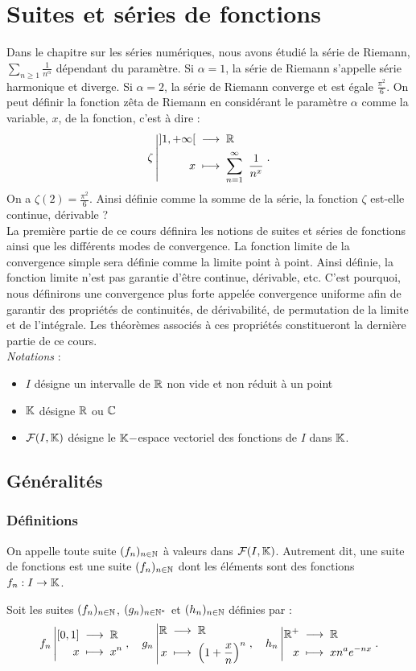 \documentclass{book}
\newcommand{\FIK}{\mathcal{F}(I,\K  )}
\newcommand{\fn}{(f_n)_{n\in \N   }}
\begin{document}
\chapter{Suites et séries de fonctions}

Dans le chapitre sur les séries numériques, nous avons étudié la série de Riemann, $\sum _{n\geq 1}{\frac {1}{n^{\alpha }}}$ dépendant du paramètre. Si $\alpha=1$, la série de Riemann s'appelle série harmonique et diverge. Si $\alpha=2$, la série de Riemann converge et est égale $\frac{\pi^2}{6}$.  On peut définir la fonction zêta de Riemann en considérant le paramètre $\alpha$ comme la variable, $x$, de la fonction, c'est à dire :
$$ {\zeta}\left|\begin{aligned}{]1,+\infty[}&\;\longrightarrow\;{\mathbb{R} }\\{x}&\;\longmapsto\;{\sum _{n=1}^{\infty }\ {\frac {1}{n^{x}}}}\end{aligned}\right..$$On a $\zeta(2)= \frac{\pi^2}{6}$. Ainsi définie comme la somme de la série, la fonction $\zeta$ est-elle continue, dérivable ? \\
La première partie de ce cours définira les notions de suites et séries de fonctions  ainsi que les différents modes de convergence. La fonction limite de la convergence simple sera définie comme la limite point à point. Ainsi définie, la fonction limite n'est pas garantie d'être continue, dérivable, etc. C'est pourquoi, nous définirons une convergence plus forte appelée convergence uniforme afin de garantir des propriétés de continuités, de dérivabilité, de permutation de la limite et de l'intégrale. Les théorèmes associés à ces  propriétés constitueront la dernière partie de ce cours. \\   
\textit{Notations} : 
\begin{itemize}
\item
  $I$ désigne un intervalle de $\mathbb{R} $ non vide et non réduit à un point
\item
  $\mathbb{K}  $ désigne $\mathbb{R} $ ou $\mathbb{C}    $
\item
  $\FIK$ désigne le $\mathbb{K}-$espace vectoriel des fonctions de $I$ dans $\mathbb{K}  $.
\end{itemize}


\section{Généralités}
\subsection{Définitions}

\begin{Definition}
On appelle  toute suite $\fn$ à valeurs dans $\FIK$.
Autrement dit, une suite de fonctions est une suite $\fn$ dont les éléments sont des fonctions $f_n: I\to \mathbb{K}  $.
\end{Definition}
\begin{Exemple}\label{ex:1}Soit les suites $(f_n)_{n\in \mathbb{N}   }$, $(g_n)_{n\in \mathbb{N}^*   }$ et $(h_n)_{n\in \mathbb{N}   }$ définies par :
$$ {f_n}\left|\begin{aligned}{[0,1]}&\;\longrightarrow\;{\mathbb{R} }\\{x}&\;\longmapsto\;{x^n}\end{aligned}\right.,\quad {g_n}\left|\begin{aligned}{\mathbb{R}}&\;\longrightarrow\;{\mathbb{R} }\\{x}&\;\longmapsto\;{\left(1+\frac x n\right)^n}\end{aligned}\right.,\quad{h_n}\left|\begin{aligned}{\mathbb{R}^+}&\;\longrightarrow\;{\mathbb{R} }\\{x}&\;\longmapsto\;{x n^a e^{-nx}}\end{aligned}\right..$$ 
\end{Exemple}
\end{document}
